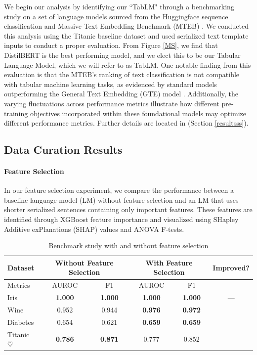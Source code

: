 \documentclass{article}
\newcommand{\cmark}{\ding{51}}%
\newcommand{\xmark}{\ding{55}}%
\theoremstyle{plain}
\theoremstyle{definition}
\theoremstyle{remark}
\begin{document}
We begin our analysis by identifying our ``TabLM" through a benchmarking study on a set of language models sourced from the Huggingface sequence classification and Massive Text Embedding Benchmark (MTEB) \cite{muennighoff2022mteb}. We conducted this analysis using the Titanic baseline dataset and used  serialized text template inputs to conduct a proper evaluation. From Figure \ref{MS}, we find that DistilBERT is the best performing model, and we elect this to be our Tabular Language Model, which we will refer to as TabLM. One notable finding from this evaluation is that the MTEB's ranking of text classification is not compatible with tabular machine learning tasks, as evidenced by standard models outperforming the General Text Embedding (GTE) model \cite{li2023towards}. Additionally, the varying fluctuations across performance metrics illustrate how different pre-training objectives incorporated within these foundational models may optimize different performance metrics. Further details are located in (Section \ref{resultsss}).

\subsection{Data Curation Results}

\paragraph{Feature Selection}

In our feature selection experiment, we compare the performance between a baseline language model (LM) without feature selection and an LM that uses shorter serialized sentences containing only important features. These features are identified through XGBoost feature importance and visualized using SHapley Additive exPlanations (SHAP) values and ANOVA F-tests. 
\vspace{-0.1cm}
\begin{table}[h!]
\caption{Benchmark study with and without feature selection}
\label{r1}
\begin{adjustbox}{width=\columnwidth}
\begin{tabular}{l|cc|cc| c}
\toprule
Dataset & \multicolumn{2}{c|}{Without Feature Selection} & \multicolumn{2}{c}{With Feature Selection} & Improved? \\
\midrule
Metrics & AUROC & F1 & AUROC & F1 & \\
\midrule
Iris &  \textbf{1.000} & \textbf{1.000} & \textbf{1.000} & \textbf{1.000} & ---  \\
Wine & 0.952 & 0.944 & \textbf{0.976} & \textbf{0.972} & \cmark  \\
Diabetes & 0.654 & 0.621 & \textbf{0.659} & \textbf{0.659} & \cmark \\
Titanic $\heartsuit$ & \textbf{0.786} & \textbf{0.871} & 0.777 & 0.852 & \xmark  \\
\bottomrule
\end{tabular}
\end{adjustbox}
\end{table}
\end{document}
